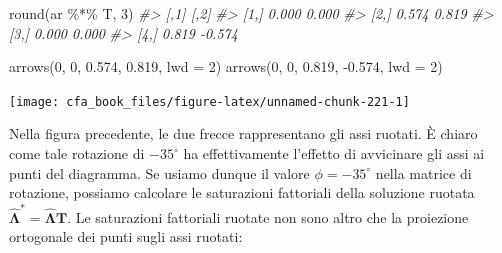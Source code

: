 \documentclass[
  11pt,
]{krantz}
\makeatletter
\newenvironment{Shaded}{\begin{snugshade}}{\end{snugshade}}
\newcommand{\AttributeTok}[1]{\textcolor[rgb]{0.61,0.61,0.61}{#1}}
\newcommand{\CommentTok}[1]{\textcolor[rgb]{0.37,0.37,0.37}{\textit{#1}}}
\newcommand{\ConstantTok}[1]{\textcolor[rgb]{0,0,0}{#1}}
\newcommand{\DecValTok}[1]{\textcolor[rgb]{0.06,0.06,0.06}{#1}}
\newcommand{\FloatTok}[1]{\textcolor[rgb]{0.06,0.06,0.06}{#1}}
\newcommand{\FunctionTok}[1]{\textcolor[rgb]{0,0,0}{#1}}
\newcommand{\NormalTok}[1]{#1}
\newcommand{\OtherTok}[1]{\textcolor[rgb]{0.37,0.37,0.37}{#1}}
\newcommand{\SpecialCharTok}[1]{\textcolor[rgb]{0,0,0}{#1}}
\newenvironment{kframe}{%
\medskip{}
\setlength{\fboxsep}{.8em}
 \def\at@end@of@kframe{}%
 \ifinner\ifhmode%
  \def\at@end@of@kframe{\end{minipage}}%
  \begin{minipage}{\columnwidth}%
 \fi\fi%
 \def\FrameCommand##1{\hskip\@totalleftmargin \hskip-\fboxsep
 \colorbox{shadecolor}{##1}\hskip-\fboxsep
     \hskip-\linewidth \hskip-\@totalleftmargin \hskip\columnwidth}%
 \MakeFramed {\advance\hsize-\width
   \@totalleftmargin\z@ \linewidth\hsize
   \@setminipage}}%
 {\par\unskip\endMakeFramed%
 \at@end@of@kframe}
\renewenvironment{Shaded}{\begin{kframe}}{\end{kframe}}
\theoremstyle{definition}
\theoremstyle{definition}
\theoremstyle{definition}
\theoremstyle{definition}
\theoremstyle{remark}
\makeatother
\begin{document}
\begin{Shaded}
\begin{Highlighting}[]
\FunctionTok{round}\NormalTok{(ar }\SpecialCharTok{\%*\%}\NormalTok{ T, }\DecValTok{3}\NormalTok{)}
\CommentTok{\#\textgreater{}       [,1]   [,2]}
\CommentTok{\#\textgreater{} [1,] 0.000  0.000}
\CommentTok{\#\textgreater{} [2,] 0.574  0.819}
\CommentTok{\#\textgreater{} [3,] 0.000  0.000}
\CommentTok{\#\textgreater{} [4,] 0.819 {-}0.574}

\FunctionTok{arrows}\NormalTok{(}\DecValTok{0}\NormalTok{, }\DecValTok{0}\NormalTok{, }\FloatTok{0.574}\NormalTok{, }\FloatTok{0.819}\NormalTok{, }\AttributeTok{lwd =} \DecValTok{2}\NormalTok{)}
\FunctionTok{arrows}\NormalTok{(}\DecValTok{0}\NormalTok{, }\DecValTok{0}\NormalTok{, }\FloatTok{0.819}\NormalTok{, }\SpecialCharTok{{-}}\FloatTok{0.574}\NormalTok{, }\AttributeTok{lwd =} \DecValTok{2}\NormalTok{)}
\end{Highlighting}
\end{Shaded}

\begin{center}\texttt{[image: cfa\_book\_files/figure-latex/unnamed-chunk-221-1]} \end{center}

Nella figura precedente, le due frecce rappresentano gli assi ruotati. È chiaro come tale rotazione di \(-35^{\circ}\) ha effettivamente l'effetto di avvicinare gli assi ai punti del diagramma. Se usiamo dunque il valore \(\phi = -35^{\circ}\) nella matrice di rotazione, possiamo calcolare le saturazioni fattoriali della soluzione ruotata \(\hat{\boldsymbol{\Lambda}}^* = \hat{\boldsymbol{\Lambda}} \textbf{T}\). Le saturazioni fattoriali ruotate non sono altro che la proiezione ortogonale dei punti sugli assi ruotati:

\begin{Shaded}
\end{Shaded}
\end{document}

